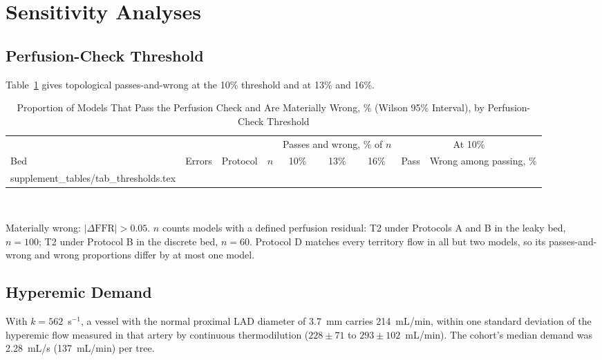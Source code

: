\documentclass[journal,twoside,web,onecolumn]{ieeecolor}
\begin{document}
\FloatBarrier
{}
\section{Sensitivity Analyses}
\subsection{Perfusion-Check Threshold}
Table~\ref{tab:thr} gives topological passes-and-wrong at the 10\% threshold and at 13\% and 16\%.
\begin{table}[!ht]
\caption{Proportion of Models That Pass the Perfusion Check and Are Materially Wrong, \% (Wilson 95\% Interval), by
Perfusion-Check Threshold}\label{tab:thr}
\centering\footnotesize
\begin{tabular}{@{}lllrcccrc@{}}
\toprule
 & & & & \multicolumn{3}{c}{Passes and wrong, \% of $n$} & \multicolumn{2}{c}{At 10\%}\\
\cmidrule(lr){5-7}\cmidrule(l){8-9}
Bed & Errors & Protocol & $n$ & 10\% & 13\% & 16\% & Pass & Wrong among passing, \%\\
\midrule
{} supplement_tables/tab_thresholds.tex 
\bottomrule
\end{tabular}
\\[3pt]
\parbox{0.85\textwidth}{\footnotesize Materially wrong: $|\Delta\mathrm{FFR}| > 0.05$. $n$ counts models with a
defined perfusion residual: T2 under Protocols A and B in the leaky bed, $n = 100$; T2 under Protocol B in the
discrete bed, $n = 60$. Protocol D matches every territory flow in all but two models, so its passes-and-wrong and wrong proportions differ by at most one model.}
\end{table}

\FloatBarrier
{}
\subsection{Hyperemic Demand}\label{sec:demand}
With $k = 562$~s$^{-1}$, a vessel with the normal proximal LAD diameter of 3.7~mm carries 214~mL/min, within one standard deviation of the hyperemic flow measured in that artery by continuous thermodilution ($228 \pm 71$ to $293 \pm 102$~mL/min). The cohort's median demand was 2.28~mL/s (137~mL/min) per tree.


\FloatBarrier
{}
\end{document}

